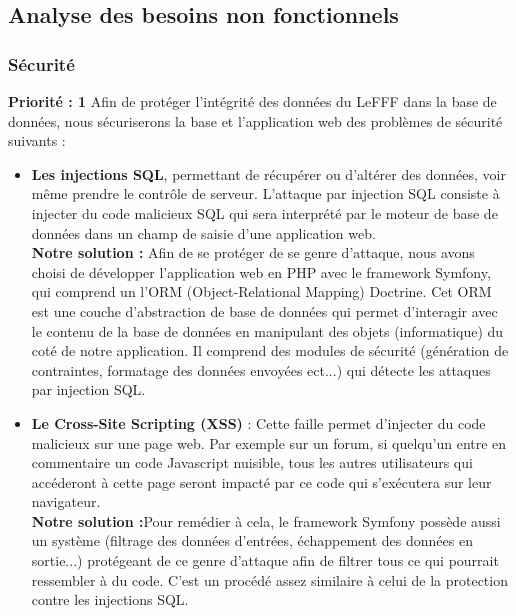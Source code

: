 \documentclass[12pt,a4paper]{article}
\begin{document}
\subsection{Analyse des besoins non fonctionnels}
\smallbreak

\subsubsection{Sécurité}
\textbf{Priorité : 1}
\smallbreak
Afin de protéger l'intégrité des données du LeFFF dans la base de données, nous sécuriserons la base et l'application web des problèmes de sécurité suivants :
\begin{itemize}
    \item \textbf{Les injections SQL}, permettant de récupérer ou d'altérer des données, voir même prendre le contrôle de serveur. L'attaque par injection SQL consiste à injecter du code malicieux SQL qui sera interprété par le moteur de base de données dans un champ de saisie d'une application web. \\
    \textbf{Notre solution :} Afin de se protéger de se genre d'attaque, nous avons choisi de développer l'application web en PHP avec le framework Symfony, qui comprend un l'ORM (Object-Relational Mapping) Doctrine. Cet ORM est une couche d'abstraction de base de données qui permet d'interagir avec le contenu de la base de données en manipulant des objets (informatique) du coté de notre application. Il comprend des modules de sécurité (génération de contraintes, formatage des données envoyées ect...) qui détecte les attaques par injection SQL.
    
    \item \textbf{Le Cross-Site Scripting (XSS)} : Cette faille permet d'injecter du code malicieux sur une page web. Par exemple sur un forum, si quelqu'un entre en commentaire un code Javascript nuisible, tous les autres utilisateurs qui accéderont à cette page seront impacté par ce code qui s'exécutera sur leur navigateur. \\
    \textbf{Notre solution :}Pour remédier à cela, le framework Symfony possède aussi un système (filtrage des données d'entrées, échappement des données en sortie...) protégeant de ce genre d'attaque afin de filtrer tous ce qui pourrait ressembler à du code. C'est un procédé assez similaire à celui de la protection contre les injections SQL.
    

\end{itemize}
\end{document}
